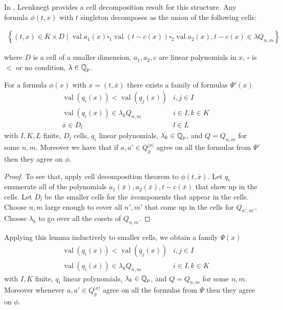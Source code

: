 \documentclass{amsart}
\newcommand{\curly}[1]{\left\{#1\right\}}
\newcommand{\paren}[1]{\left(#1\right)}
\DeclareMathOperator{\val}{val}
\begin{document}
In \cite{reduct}, Leenknegt provides a cell decomposition result for this structure.
Any formula $\phi(t, x)$  with $t$  singleton decomposes as the union of the following cells:

\begin{align*}
	\curly{(t, x) \in K \times D \mid \val a_1(x) \square_1 \val (t - c(x)) \square_2 \val a_2(x), t - c(x) \in \lambda Q_{n,m} }
\end{align*}

where $D$ is a cell of a smaller dimension, $a_1, a_2, c$ are linear polynomials in  $x$, $\square$ is $<$ or no condition, $\lambda  \in\mathbb{Q}_p$.

\begin{Lemma}
	For a formula $\phi(x)$ with $x = (t, \bar x)$ there exists a family of formulas $\Psi'(x)$
	\begin{align*}
		&\val \paren{q_i(x)} < \val \paren{q_j(x)} & i, j \in I \\
		&\val \paren{q_i(x)} \in \lambda_k Q_{n,m} & i \in I , k \in K \\
		&\bar x \in D_l & l \in L
	\end{align*}
	with $I, K, L$ finite,
	$D_l$ cells,
	$q_i$ linear polynomials,
	$\lambda_k \in \mathbb{Q}_p$, and
	$Q = Q_{n,m}$ for some $n,m$.
	Moreover we have that if $a, a' \in Q_p^{|x|}$ agree on all the formulas from $\Psi'$ then they agree on $\phi$.
\end{Lemma}

\begin{proof}
	To see that, apply cell decomposition theorem to $\phi(t, \bar x)$.
	Let $q_i$ enumerate all of the polynomials $a_1(\bar x), a_2(\bar x), t - c(\bar x)$ that show up in the cells.
	Let $D_l$ be the smaller cells for the $\bar x$components that appear in the cells.
	Choose $n,m$ large enough to cover all $n', m'$ that come up in the cells for $Q_{n',m'}$.
	Choose $\lambda_k$ to go over all the cosets of $Q_{n,m}$.
\end{proof}

Applying this lemma inductively to smaller cells, we obtain a family $\Psi(x)$
\begin{align*}
		&\val \paren{q_i(x)} < \val \paren{q_j(x)} & i, j \in I \\
		&\val \paren{q_i(x)} \in \lambda_k Q_{n,m} & i \in I , k \in K
\end{align*}
with $I, K$ finite,
$q_i$ linear polynomials,
$\lambda_k \in \mathbb{Q}_p$, and
$Q = Q_{n,m}$ for some $n,m$.
Moreover whenever $a, a' \in Q_p^{|x|}$ agree on all the formulas from $\Psi$ then they agree on $\phi$.
\end{document}
